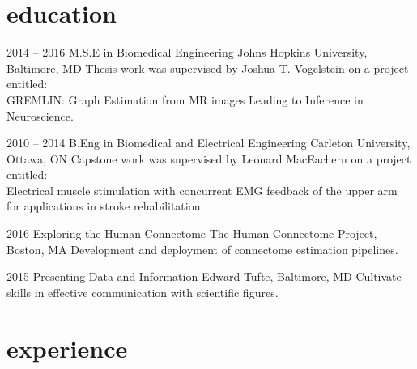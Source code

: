 \documentclass[]{friggeri-cv} %
\begin{document}

\section{education}

\begin{entrylist}


\entry
{2014 -- 2016}
{M.S.E {\normalfont in Biomedical Engineering}}
{Johns Hopkins University, Baltimore, MD}
{Thesis work was supervised by Joshua T. Vogelstein on a project entitled:\\GREMLIN:
Graph Estimation from MR images Leading to Inference in Neuroscience.}


\entry
{2010 -- 2014}
{B.Eng {\normalfont in Biomedical and Electrical Engineering}}
{Carleton University, Ottawa, ON}
{Capstone work was supervised by Leonard MacEachern on a project entitled:\\Electrical
muscle stimulation with concurrent EMG feedback of the upper arm for applications in stroke
rehabilitation.}


\entry
{2016}
{Exploring the Human Connectome}
{The Human Connectome Project, Boston, MA}
{Development and deployment of connectome estimation pipelines.}


\entry
{2015}
{Presenting Data and Information}
{Edward Tufte, Baltimore, MD}
{Cultivate skills in effective communication with scientific figures.}

\end{entrylist}


\section{experience}
\end{document}
